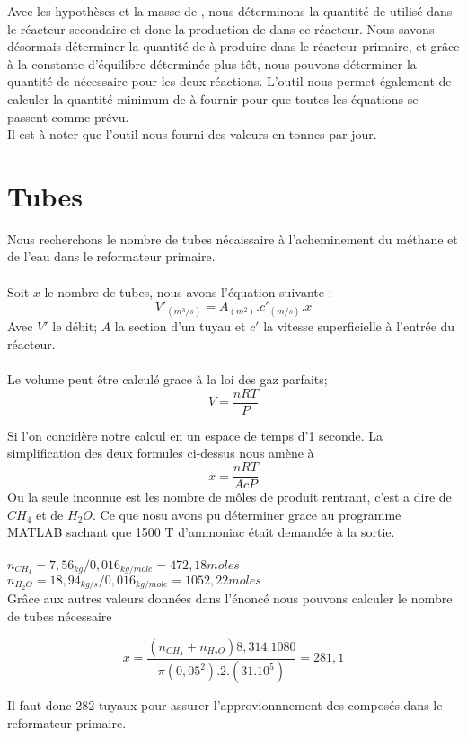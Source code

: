\documentclass[a4paper, oneside, 12pt]{article}
\begin{document}
Avec les hypothèses et la masse de , nous déterminons la quantité de  
utilisé dans le réacteur secondaire et donc la production de  dans ce réacteur. Nous savons désormais 
déterminer la quantité de  à produire dans le réacteur primaire, et grâce à la constante d'équilibre déterminée 
plus tôt, nous pouvons déterminer la quantité de  nécessaire pour les deux réactions. L'outil nous permet également
de calculer la quantité minimum de  à fournir pour que toutes les équations se passent comme prévu. 
\\

Il est à noter que l'outil nous fourni des valeurs en tonnes par jour.

\section*{Tubes}
Nous recherchons le nombre de tubes nécaissaire à l'acheminement du méthane et de l'eau dans le reformateur primaire.\\
\\
Soit $x$ le nombre de tubes, nous avons l'équation suivante :
\[
V'_{(m^3/s)} = A_{(m^2)}. c'_{(m/s)} .x
\]
Avec $V'$ le débit; $A$ la section d'un tuyau et $c'$ la vitesse superficielle à l'entrée du réacteur.\\
\\
Le volume peut être calculé grace à la loi des gaz parfaits;
\[
V=\frac{nRT}{P}
\]

Si l'on concidère notre calcul en un espace de temps d'1 seconde. La simplification des deux formules ci-dessus nous amène à
\[
x=\frac{nRT}{AcP}
\]
Ou la seule inconnue est les nombre de môles de produit rentrant, c'est a dire de $CH_{4}$ et de $H_{2}O$. Ce que nosu avons pu déterminer grace au programme MATLAB sachant que 1500 T d'ammoniac était demandée à la sortie.\\
\\
$n_{CH_{4}}= 7,56_{kg} / 0,016_{kg/mole} = 472,18 moles$\\
$n_{H_{2}O}= 18,94_{kg/s}/ 0,016_{kg/mole} = 1052,22 moles$\\

Grâce aux autres valeurs données dans l'énoncé nous pouvons calculer le nombre de tubes nécessaire 


\[
x=\frac{(n_{CH_{4}}+n_{H_{2}O})8,314.1080}{\pi(0,05^2).2.(31.10^5)}=281,1
\]

Il faut donc 282 tuyaux pour assurer l'approvionnnement des composés dans le reformateur primaire.
\end{document}
